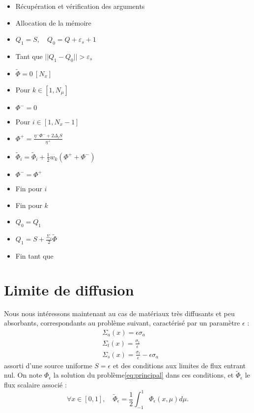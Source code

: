 \documentclass[11pt,a4paper]{article}
\newcommand{\norm}[1]{\big|\big|#1\big|\big|}
\newcommand{\Phit}{\widetilde{\Phi}}
\begin{document}
\begin{itemize}
\item Récupération et vérification des arguments
\item Allocation de la mémoire
\item $Q_1 = S, \quad Q_0 = Q + \varepsilon_s +1$
\item[\textcolor{red}{\textbullet}] Tant que $\norm{Q_1 - Q_0}>\varepsilon_s$
  \setlength\itemindent{35pt}
\item $\Phit=0~[N_x]$
\item[\textcolor{red}{\textbullet}] Pour $k\in[1,N_{\mu}]$
  \setlength\itemindent{70pt}
\item $\Phi^- = 0$
\item[\textcolor{red}{\textbullet}] Pour $i\in[1, N_x-1]$
  \setlength\itemindent{105pt}
\item $\Phi^+ = \frac{\eta^- \Phi^- + 2 \Delta_i S}{\eta^+}$
\item $\Phit_i =  \Phit_i + \frac{1}{2} w_k (\Phi^+ + \Phi^-)$
\item $\Phi^- = \Phi^+$
  \setlength\itemindent{70pt}
\item[\textcolor{red}{\textbullet}] Fin pour $i$
   \setlength\itemindent{35pt}
\item[\textcolor{red}{\textbullet}] Fin pour $k$ 
\item $Q_0 = Q_1$
\item $Q_1 = S + \frac{\Sigma_s}{2} \Phit$
   \setlength\itemindent{0pt}
\item[\textcolor{red}{\textbullet}] Fin tant que  
\end{itemize}
 
 \section{Limite de diffusion}
 
 Nous nous intéressons maintenant au cas de matériaux très diffusants et peu absorbants, correspondants au problème suivant, caractérisé par un paramètre $\epsilon$ :
  \begin{align}
   &\Sigma_a(x) = \epsilon \sigma_a\\
   &\Sigma_t(x) = \frac{\sigma_t}{\epsilon}\\
   &\Sigma_s(x) = \frac{\sigma_t}{\epsilon} - \epsilon \sigma_a
  \end{align}
 assorti d'une source uniforme $S = \epsilon$ et des conditions aux limites de flux entrant nul.
 On note $\Phi_\epsilon$ la solution du problème\ref{eq:principal} dans ces conditions, et $\Phit_\epsilon$ le flux scalaire associé :
 \begin{equation}
  \forall x\in [0,1], \quad \Phit_\epsilon = \frac{1}{2} \int_{-1}^1 \Phi_\epsilon(x,\mu) d\mu .
 \end{equation}
 
\end{document}
